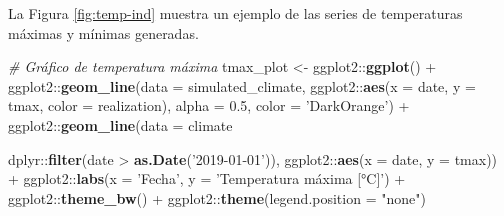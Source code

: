 \documentclass[
  12pt]{article}
\newenvironment{Shaded}{}{}
\newcommand{\CommentTok}[1]{\textcolor[rgb]{0.38,0.63,0.69}{\textit{#1}}}
\newcommand{\DataTypeTok}[1]{\textcolor[rgb]{0.56,0.13,0.00}{#1}}
\newcommand{\FloatTok}[1]{\textcolor[rgb]{0.25,0.63,0.44}{#1}}
\newcommand{\KeywordTok}[1]{\textcolor[rgb]{0.00,0.44,0.13}{\textbf{#1}}}
\newcommand{\NormalTok}[1]{#1}
\newcommand{\OperatorTok}[1]{\textcolor[rgb]{0.40,0.40,0.40}{#1}}
\newcommand{\StringTok}[1]{\textcolor[rgb]{0.25,0.44,0.63}{#1}}
\begin{document}
La Figura \ref{fig:temp-ind} muestra un ejemplo de las series de temperaturas máximas y mínimas generadas.

\begin{Shaded}
\begin{Highlighting}[]
\CommentTok{# Gráfico de temperatura máxima}
\NormalTok{tmax_plot <-}\StringTok{ }\NormalTok{ggplot2}\OperatorTok{::}\KeywordTok{ggplot}\NormalTok{() }\OperatorTok{+}
\StringTok{  }\NormalTok{ggplot2}\OperatorTok{::}\KeywordTok{geom_line}\NormalTok{(}\DataTypeTok{data =}\NormalTok{ simulated_climate, }
\NormalTok{                     ggplot2}\OperatorTok{::}\KeywordTok{aes}\NormalTok{(}\DataTypeTok{x =}\NormalTok{ date, }\DataTypeTok{y =}\NormalTok{ tmax, }\DataTypeTok{color =}\NormalTok{ realization),}
                     \DataTypeTok{alpha =} \FloatTok{0.5}\NormalTok{, }\DataTypeTok{color =} \StringTok{'DarkOrange'}\NormalTok{) }\OperatorTok{+}
\StringTok{  }\NormalTok{ggplot2}\OperatorTok{::}\KeywordTok{geom_line}\NormalTok{(}\DataTypeTok{data =}\NormalTok{ climate }\OperatorTok{%
\StringTok{                       }\NormalTok{dplyr}\OperatorTok{::}\KeywordTok{filter}\NormalTok{(date }\OperatorTok{>}\StringTok{ }\KeywordTok{as.Date}\NormalTok{(}\StringTok{'2019-01-01'}\NormalTok{)), }
\NormalTok{                     ggplot2}\OperatorTok{::}\KeywordTok{aes}\NormalTok{(}\DataTypeTok{x =}\NormalTok{ date, }\DataTypeTok{y =}\NormalTok{ tmax)) }\OperatorTok{+}
\StringTok{  }\NormalTok{ggplot2}\OperatorTok{::}\KeywordTok{labs}\NormalTok{(}\DataTypeTok{x =} \StringTok{'Fecha'}\NormalTok{, }\DataTypeTok{y =} \StringTok{'Temperatura máxima [°C]'}\NormalTok{) }\OperatorTok{+}
\StringTok{  }\NormalTok{ggplot2}\OperatorTok{::}\KeywordTok{theme_bw}\NormalTok{() }\OperatorTok{+}
\StringTok{  }\NormalTok{ggplot2}\OperatorTok{::}\KeywordTok{theme}\NormalTok{(}\DataTypeTok{legend.position =} \StringTok{"none"}\NormalTok{)}

}
\end{Highlighting}
\end{Shaded}
\end{document}
